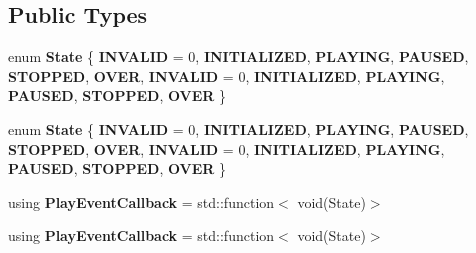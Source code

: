 \subsection*{Public Types}
\begin{DoxyCompactItemize}
\item 
\mbox{\label{classcocos2d_1_1experimental_1_1IAudioPlayer_a98fb23b100519ce18986de9095345764}} 
enum {\bfseries State} \{ \newline
{\bfseries I\+N\+V\+A\+L\+ID} = 0, 
{\bfseries I\+N\+I\+T\+I\+A\+L\+I\+Z\+ED}, 
{\bfseries P\+L\+A\+Y\+I\+NG}, 
{\bfseries P\+A\+U\+S\+ED}, 
\newline
{\bfseries S\+T\+O\+P\+P\+ED}, 
{\bfseries O\+V\+ER}, 
{\bfseries I\+N\+V\+A\+L\+ID} = 0, 
{\bfseries I\+N\+I\+T\+I\+A\+L\+I\+Z\+ED}, 
\newline
{\bfseries P\+L\+A\+Y\+I\+NG}, 
{\bfseries P\+A\+U\+S\+ED}, 
{\bfseries S\+T\+O\+P\+P\+ED}, 
{\bfseries O\+V\+ER}
 \}
\item 
\mbox{\label{classcocos2d_1_1experimental_1_1IAudioPlayer_a98fb23b100519ce18986de9095345764}} 
enum {\bfseries State} \{ \newline
{\bfseries I\+N\+V\+A\+L\+ID} = 0, 
{\bfseries I\+N\+I\+T\+I\+A\+L\+I\+Z\+ED}, 
{\bfseries P\+L\+A\+Y\+I\+NG}, 
{\bfseries P\+A\+U\+S\+ED}, 
\newline
{\bfseries S\+T\+O\+P\+P\+ED}, 
{\bfseries O\+V\+ER}, 
{\bfseries I\+N\+V\+A\+L\+ID} = 0, 
{\bfseries I\+N\+I\+T\+I\+A\+L\+I\+Z\+ED}, 
\newline
{\bfseries P\+L\+A\+Y\+I\+NG}, 
{\bfseries P\+A\+U\+S\+ED}, 
{\bfseries S\+T\+O\+P\+P\+ED}, 
{\bfseries O\+V\+ER}
 \}
\item 
\mbox{\label{classcocos2d_1_1experimental_1_1IAudioPlayer_aa426be9a1c7f6aee14487fa78126e34f}} 
using {\bfseries Play\+Event\+Callback} = std\+::function$<$ void(State)$>$
\item 
\mbox{\label{classcocos2d_1_1experimental_1_1IAudioPlayer_aa426be9a1c7f6aee14487fa78126e34f}} 
using {\bfseries Play\+Event\+Callback} = std\+::function$<$ void(State)$>$
\end{DoxyCompactItemize}

